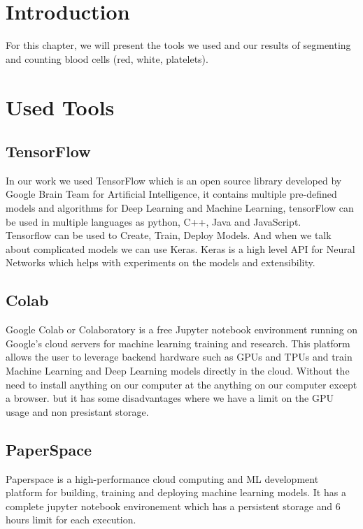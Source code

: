 \section{Introduction}
\vspace{0.2in}
\hspace*{0.16in}
For this chapter, we will present the tools we used and our results of segmenting and counting blood cells (red, white, platelets).

\section{Used Tools}
\vspace{0.2in}
\hspace*{0.16in}

\subsection{TensorFlow}
In our work we used TensorFlow which is an open source library developed by Google Brain Team for Artificial Intelligence, it contains multiple pre-defined models and algorithms for Deep Learning and Machine Learning, tensorFlow can be used in multiple languages as python, C++, Java and JavaScript.\\
Tensorflow can be used to Create, Train, Deploy Models. And when we talk about complicated models we can use Keras.
Keras is a high level API for Neural Networks which helps with experiments on the models and extensibility.

\subsection{Colab}
Google Colab or Colaboratory is a free Jupyter notebook environment running on Google's cloud servers for machine learning training and research. This platform allows the user to leverage backend hardware such as GPUs and TPUs and train Machine Learning and Deep Learning models directly in the cloud. Without the need to install anything on our computer at the anything on our computer except a browser.
but it has some disadvantages where we have a limit on the GPU usage
and non presistant storage.

\subsection{PaperSpace}
Paperspace is a high-performance cloud computing and ML development platform for building, training and deploying machine learning models. It has a complete jupyter notebook environement which has a persistent storage and 6 hours limit for each execution.


